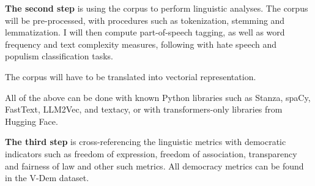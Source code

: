 \documentclass[12pt,a4paper,sans]{moderncv} %
\begin{document}
\vspace{2mm}

\textbf{The second step} is using the corpus to perform linguistic analyses. The corpus will be pre-processed, with procedures such as tokenization, stemming and lemmatization. I will then compute part-of-speech tagging, as well as word frequency and text complexity measures, following with hate speech and populism classification tasks. 

The corpus will have to be translated into vectorial representation.

All of the above can be done with known Python libraries such as Stanza, spaCy, FastText, LLM2Vec, and textacy, or with transformers-only libraries from Hugging Face. 

\vspace{2mm}

\textbf{The third step} is cross-referencing the linguistic metrics with democratic indicators such as freedom of expression, freedom of association, transparency and fairness of law and other such metrics. All democracy metrics can be found in the V-Dem dataset.









\end{document}

